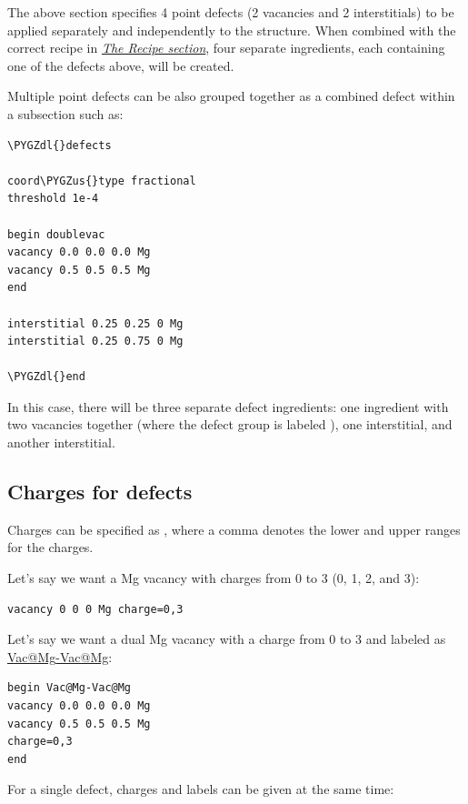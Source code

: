\documentclass[letterpaper,10pt,english]{sphinxmanual}
\def\PYGZus{\char`\_}
\def\PYGZdl{\char`\$}
\begin{document}
The above section specifies 4 point defects (2 vacancies and 2 interstitials) to be applied separately and independently to the structure. When combined with the correct recipe in {\hyperref[3_1_3_recipe::doc]{\emph{The Recipe section}}}, four separate ingredients, each containing one of the defects above, will be created.

Multiple point defects can be also grouped together as a combined defect within a  subsection such as:

\begin{Verbatim}[commandchars=\\\{\}]
\PYGZdl{}defects

coord\PYGZus{}type fractional
threshold 1e-4

begin doublevac
vacancy 0.0 0.0 0.0 Mg
vacancy 0.5 0.5 0.5 Mg
end

interstitial 0.25 0.25 0 Mg
interstitial 0.25 0.75 0 Mg

\PYGZdl{}end
\end{Verbatim}

In this case, there will be three separate defect ingredients: one ingredient with two vacancies together (where the defect group is labeled ), one interstitial, and another interstitial.


\subsection{Charges for defects}
\label{3_1_5_defects:charges-for-defects}
Charges can be specified as , where a comma denotes the lower and upper ranges for the charges.

Let's say we want a Mg vacancy with charges from 0 to 3 (0, 1, 2, and 3):

\begin{Verbatim}[commandchars=\\\{\}]
vacancy 0 0 0 Mg charge=0,3
\end{Verbatim}

Let's say we want a dual Mg vacancy with a charge from 0 to 3 and labeled as \href{mailto:Vac@Mg}{Vac@Mg}\href{mailto:-Vac@Mg}{-Vac@Mg}:

\begin{Verbatim}[commandchars=\\\{\}]
begin Vac@Mg-Vac@Mg
vacancy 0.0 0.0 0.0 Mg
vacancy 0.5 0.5 0.5 Mg
charge=0,3
end
\end{Verbatim}

For a single defect, charges and labels can be given at the same time:
\end{document}
